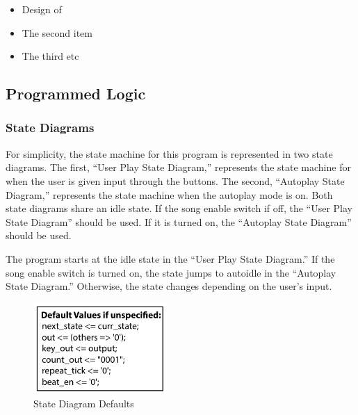 \documentclass{article}
\begin{document}
      \begin{itemize}
        \item Design of
        \item The second item
        \item The third etc 
      \end{itemize}

    \newpage
	\subsection{Programmed Logic}

	    \subsubsection{State Diagrams}

		    
		    \begin{multicols}{2}
	    		For simplicity, the state machine for this program is represented in two state diagrams. The first, ``User Play State Diagram,'' represents the state machine for when the user is given input through the buttons. The second, ``Autoplay State Diagram,'' represents the state machine when the autoplay mode is on. Both state diagrams share an idle state. If the song enable switch if off, the ``User Play State Diagram'' should be used. If it is turned on, the ``Autoplay State Diagram'' should be used.

	    		The program starts at the idle state in the ``User Play State Diagram.'' If the song enable switch is turned on, the state jumps to autoidle in the ``Autoplay State Diagram.'' Otherwise, the state changes depending on the user's input.

		    \columnbreak

			    \begin{figure}[H]
			      \centering
			      \includegraphics[width=2in]{img/StateDiagramDefaults}
			      \caption{State Diagram Defaults}
			    \end{figure}
		    \end{multicols}
\end{document}
